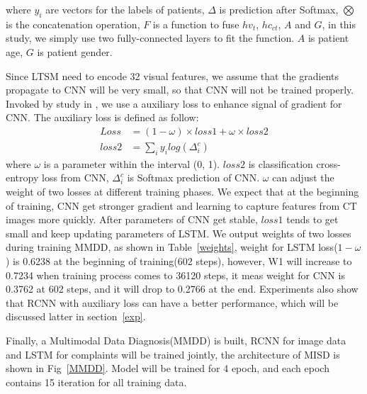 \documentclass[runningheads]{llncs}
\begin{document}
where $y_i$ are vectors for the labels of patients, $\Delta$ is prediction after Softmax, $\bigotimes$ is the concatenation operation, $F$ is a function to fuse $hv_t$, $hc_{ct}$, $A$ and $G$, in this study, we simply use two fully-connected layers to fit the function. $A$ is patient age, $G$ is patient gender.

Since LTSM need to encode 32 visual features, we assume that the gradients propagate to CNN will be very small, so that CNN will not be trained properly. Invoked by study in \cite{szegedy2016rethinking}, we use a auxiliary loss to enhance signal of gradient for CNN.
The auxiliary loss is defined as follow: 
\begin{align*}
Loss &=  (1 - \omega) \times loss1 +  \omega \times loss2 \\
loss2 &= \sum_i{y_i log(\Delta^c_i)}
\end{align*}
where $\omega$ is a parameter within the interval (0, 1). $loss2$ is classification cross-entropy loss from CNN, $\Delta^c_i$ is Softmax prediction of CNN. $\omega$ can adjust the weight of two losses at different training phases.
We expect that at the beginning of training, CNN get stronger gradient and learning to capture features from CT images more quickly. After parameters of CNN get stable, $loss1$ tends to get small and keep updating parameters of LSTM. We output weights of two losses during training MMDD, as shown in Table~\ref{weights}, weight for LSTM loss($1 - \omega$) is 0.6238 at the beginning of training(602 steps), however, W1 will increase to 0.7234 when training process comes to 36120 steps, it meas weight for CNN is 0.3762 at 602 steps, and it will drop to 0.2766 at the end. Experiments also show that RCNN with auxiliary loss can have a better performance, which will be discussed latter in section~\ref{exp}.

Finally, a Multimodal Data Diagnosis(MMDD) is built, RCNN for image data and LSTM for complaints will be trained jointly, the architecture of MISD is shown in Fig~\ref{MMDD}. Model will be trained for 4 epoch, and each epoch contains 15 iteration for all training data.
\end{document}
